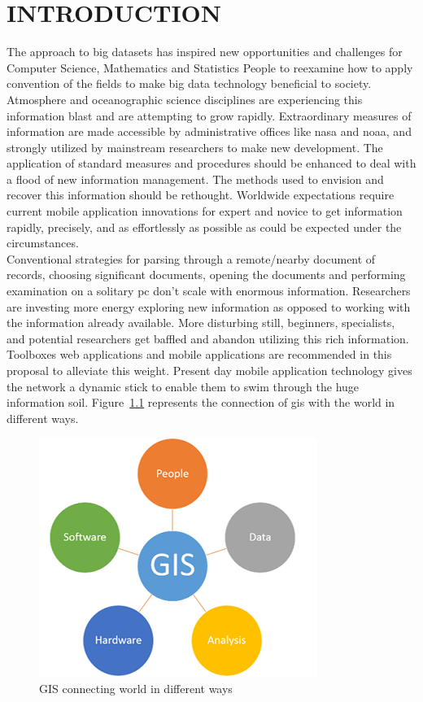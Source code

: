 \chapter{INTRODUCTION}
\label{chap:intro}

The approach to big datasets has inspired new opportunities and challenges for Computer Science, Mathematics and Statistics People to reexamine how to apply convention of the fields to make big data technology beneficial to society. Atmosphere and oceanographic science disciplines are experiencing this information blast and are attempting to grow rapidly. Extraordinary measures of information are made accessible by administrative offices like \gls{nasa} and \gls{noaa}, and strongly utilized by mainstream researchers to make new development. The application of standard measures and procedures should be enhanced to deal with a flood of new information management. The methods used to envision and recover this information should be rethought. Worldwide expectations require current mobile application innovations for expert and novice to get information rapidly, precisely, and as effortlessly as possible as could be expected under the circumstances. \\
Conventional strategies for parsing through a remote/nearby document of records, choosing significant documents, opening the documents and performing examination on a solitary \gls{pc} don't scale with enormous information. Researchers are investing more energy exploring new information as opposed to working with the information already available. More disturbing still, beginners, specialists, and potential researchers get baffled and abandon utilizing this rich information. Toolboxes web applications and mobile applications are recommended in this proposal to alleviate this weight. Present day mobile application technology gives the network a dynamic stick to enable them to swim through the huge information soil. Figure~\ref{fig:gis_world} represents the connection of \gls{gis} with the world in different ways.

    \begin{figure}[H]
            \centering
            \includegraphics[width=0.50\linewidth]{figures/ch1/gis.png}
            \caption{\label{fig:gis_world} GIS connecting world in different ways \cite{CDC}}
    \end{figure}

